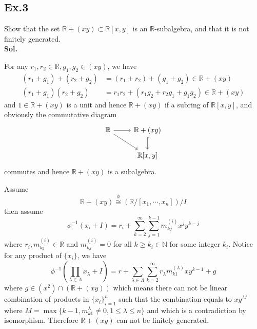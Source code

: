 \documentclass[lang=en,11pt,a4paper,citestyle =authoryear]{elegantpaper}
\begin{document}
\subsection*{Ex.3} 
Show that the set $\mathbb{R}+(xy) \subset \mathbb{R}[x,y]$ is an $\mathbb{R}$-subalgebra, and that it is not finitely generated.
\vspace{0.5em}\\
\textbf{Sol.} \par
For any $r_1,r_2\in \mathbb{R}, g_1,g_2\in (xy)$, we have
\[
\begin{aligned}
    (r_1+g_1)+(r_2+g_2) &= (r_1+r_2)+(g_1+g_2)\in \mathbb{R}+(xy) \\ (r_1+g_1)(r_2+g_2) &= r_1r_2 + (r_1g_2+r_2g_1+g_1g_2)\in\mathbb{R}+(xy)
\end{aligned}
\]
and $1\in \mathbb{R}+(xy)$ is a unit and hence $\mathbb{R}+(xy)$ if a subring of $\mathbb{R}[x,y]$, and obviously the commutative diagram
\[
\begin{tikzcd}
\mathbb{R}\arrow[r]\arrow[rd] & \mathbb{R} + (xy)\arrow[hookrightarrow]{d}\\
&\mathbb{R}[x,y]
\end{tikzcd}
\]
commutes and hence $\mathbb{R}+(xy)$ is a subalgebra.\par
Assume
\[
\mathbb{R}+(xy)\overset{\phi}{\cong} \left(\mathbb{R}/[x_1,\cdots,x_n]\right)/I
\]
then assume
\[
\phi^{-1}(x_i+I) = r_i+\sum\limits_{k=2}^{\infty}\sum\limits_{j=1}^{k-1}m_{kj}^{(i)}x^jy^{k-j}
\]
where $r_i,m^{(i)}_{kj} \in \mathbb{R}$ and $m_{kj}^{(i)} = 0$ for all $k\geq k_i \in \mathbb{N}$ for some integer $k_i$. Notice for any product of $\{x_i\}$, we have
\[
\phi^{-1}(\prod_{\lambda \in\Lambda} x_\lambda+I) = r+\sum\limits_{\lambda \in \Lambda}\sum\limits_{k=2}^{\infty}r_{\lambda}m_{k1}^{(\lambda)}xy^{k-1} + g
\]
where $g\in (x^2)\cap\left(\mathbb{R}+(xy)\right)$
which means there can not be linear combination of products in $\{x_i\}_{i=1}^n$ such that the combination equals to $xy^M$ where $M = \max\{k-1, m_{k1}^{\lambda} \neq 0, 1\leq \lambda \leq n\}$ and which is a contradiction by isomorphism. Therefore $\mathbb{R}+(xy)$ can not be finitely generated.
\par 
\vspace{0.5em}
\end{document}

